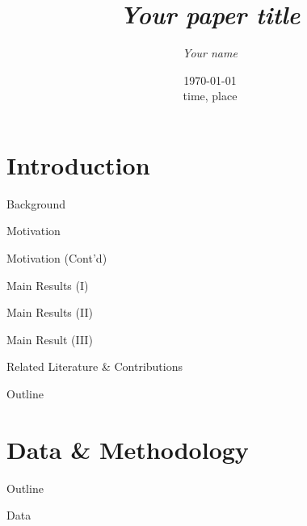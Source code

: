 \documentclass[10pt, mathserif, hyperref={hidelinks,colorlinks=true,linkcolor=blue,citecolor=blue},xcolor={dvipsnames}]{beamer}
\title[{\color{white} Short title}]{\textit{Your paper title}}
\author[Your name]{\itshape Your name}
\date[\today]
	{\small{\today \\ time, place}}
\begin{document}
\begin{frame}[fragile]
    \titlepage
\end{frame}

\section{Introduction}

\begin{frame}{Background}
    \cite{lecun2015deep}
\end{frame}

\begin{frame}{Motivation}

\end{frame}

\begin{frame}{Motivation (Cont'd)}

\end{frame}

\begin{frame}{Main Results (I)}

\end{frame}

\begin{frame}{Main Results (II)}

\end{frame}

\begin{frame}{Main Result (III)}
    
\end{frame}

\begin{frame}{Related Literature \& Contributions}

\end{frame}


\begin{frame}{Outline}
    \tableofcontents
\end{frame}

\section{Data \& Methodology}

{   
    \begin{frame}{Outline}
    \tableofcontents[currentsection]
    \end{frame}
}

\begin{frame}{Data}

\end{frame}
\end{document}
